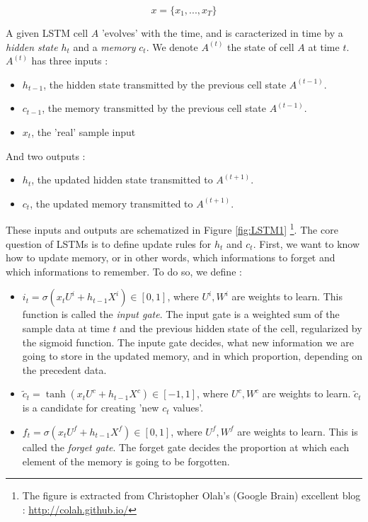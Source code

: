 \documentclass{article}
\begin{document}
\[   x =\{x_1, ..., x_T \} \]

\noindent A given LSTM cell $A$ 'evolves' with the time, and is caracterized in time 
by a \textit{hidden state} $h_t$ and a \textit{memory} $c_t$. We denote $A^{(t)}$ the state of cell
$A$ at time $t$. $A^{(t)}$   has three inputs : 
\begin{itemize}
    \item $h_{t-1}$, the hidden state transmitted by the previous cell state $A^{(t-1)}$. 
    \item $c_{t-1}$, the memory transmitted by the previous cell state $A^{(t-1)}$.
    \item $x_t$, the 'real' sample input
\end{itemize}
And two outputs : 
\begin{itemize}
    \item $h_{t}$, the updated hidden state transmitted to  $A^{(t+1)}$. 
    \item $c_{t}$, the updated memory transmitted to  $A^{(t+1)}$.
\end{itemize}
These inputs and outputs are schematized in Figure \ref{fig:LSTM1} \footnote{The figure is extracted from Christopher Olah's (Google Brain) excellent blog : \href{http://colah.github.io/posts/2015-08-Understanding-LSTMs/}{http://colah.github.io/}}. 
The core question of LSTMs is to define update rules for $h_t$ and $c_t$. First, we want to 
know how to update memory, or in other words, which informations to forget and which informations
to remember. To do so, we define :
\begin{itemize}
    \item $i_t = \sigma\left ( x_t U^i + h_{t-1} X^{i}\right) \in [0, 1]$, where $U^i, W^i$ are weights to learn.
         This function is called the \textit{input gate}. The input gate is a weighted sum of
         the sample data at time $t$ and the previous hidden state of the cell, regularized by the sigmoid function.
         The inpute gate decides, what new information we are going to store in the updated memory, and in
         which proportion, depending on the precedent data. 
    \item $\tilde{c}_t = \tanh \left ( x_t U^c + h_{t-1} X^{c}\right ) \in [-1, 1] $, where $U^c, W^c$ are weights to learn.
    $\tilde{c}_t$ is a candidate for creating 'new $c_{t}$ values'.
    \item $f_t = \sigma \left (x_t U^f + h_{t-1} X^{f}\right ) \in [0,1]$, where $U^f, W^f$ are weights to learn.
    This is called the \textit{forget gate}. The forget gate decides the proportion at which each element of the 
    memory is going to be forgotten.
\end{itemize}
\end{document}
